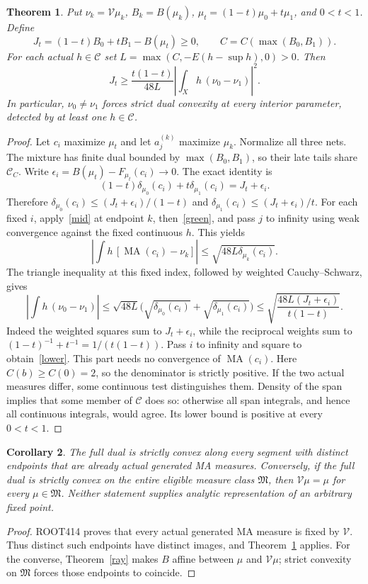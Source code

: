 \documentclass[11pt]{article}
\newtheorem{theorem}{Theorem}
\newtheorem{corollary}[theorem]{Corollary}
\newcommand{\C}{\mathcal C}
\newcommand{\M}{\mathfrak M}
\newcommand{\MA}{\operatorname{MA}}
\newcommand{\V}{\mathcal V}
\begin{document}
\begin{theorem}\label{jensen}
Put $\nu_k=\V\mu_k$, $B_k=B(\mu_k)$,
$\mu_t=(1-t)\mu_0+t\mu_1$, and $0<t<1$. Define
\[
 J_t=(1-t)B_0+tB_1-B(\mu_t)\ge0,\qquad
 C=C(\max(B_0,B_1)).
\]
For each actual $h\in\C$ set $L=\max(C,-E(h-\sup h),0)>0$.
Then
\begin{equation}\label{lower}
 J_t\ge\frac{t(1-t)}{48L}
       \left|\int_Xh\,(\nu_0-\nu_1)\right|^2.
\end{equation}
In particular, $\nu_0\ne\nu_1$ forces strict dual convexity
at every interior parameter, detected by at least one $h\in\C$.
\end{theorem}
\begin{proof}
Let $c_i$ maximize $\mu_t$ and let $a_j^{(k)}$ maximize $\mu_k$.
Normalize all three nets. The mixture has finite dual bounded by
$\max(B_0,B_1)$, so their late tails share $\C_C$. Write
$\epsilon_i=B(\mu_t)-F_{\mu_t}(c_i)\to0$. The exact identity is
\[
 (1-t)\delta_{\mu_0}(c_i)+t\delta_{\mu_1}(c_i)=J_t+\epsilon_i.
\]
Therefore $\delta_{\mu_0}(c_i)\le(J_t+\epsilon_i)/(1-t)$ and
$\delta_{\mu_1}(c_i)\le(J_t+\epsilon_i)/t$. For each fixed $i$,
apply~\eqref{mid} at endpoint $k$, then~\eqref{green}, and pass
$j$ to infinity using weak convergence against the fixed continuous
$h$. This yields
\[
 \left|\int h\,[\MA(c_i)-\nu_k]\right|
       \le\sqrt{48L\delta_{\mu_k}(c_i)}.
\]
The triangle inequality at this fixed index, followed by weighted
Cauchy--Schwarz, gives
\[
 \left|\int h\,(\nu_0-\nu_1)\right|
 \le\sqrt{48L}\bigl(\sqrt{\delta_{\mu_0}(c_i)}+
                       \sqrt{\delta_{\mu_1}(c_i)}\bigr)
 \le\sqrt{\frac{48L(J_t+\epsilon_i)}{t(1-t)}}.
\]
Indeed the weighted squares sum to $J_t+\epsilon_i$, while the
reciprocal weights sum to $(1-t)^{-1}+t^{-1}=1/(t(1-t))$.
Pass $i$ to infinity and square to obtain~\eqref{lower}. This
part needs no convergence of $\MA(c_i)$.
Here $C(b)\ge C(0)=2$, so the denominator is strictly positive.
If the two actual measures differ, some continuous test distinguishes
them. Density of the span implies that some member of $\C$ does
so: otherwise all span integrals, and hence all continuous integrals,
would agree. Its lower bound is positive at every $0<t<1$.
\end{proof}

\begin{corollary}
The full dual is strictly convex along every segment with distinct
endpoints that are already actual generated MA measures. Conversely,
if the full dual is strictly convex on the entire eligible measure
class $\M$, then $\V\mu=\mu$ for every $\mu\in\M$.
Neither statement supplies analytic representation of an arbitrary
fixed point.
\end{corollary}
\begin{proof}
ROOT414 proves that every actual generated MA measure is fixed by
$\V$. Thus distinct such endpoints have distinct images, and
Theorem~\ref{jensen} applies. For the converse,
Theorem~\ref{ray} makes $B$ affine between $\mu$ and $\V\mu$;
strict convexity on $\M$ forces those endpoints to coincide.
\end{proof}
\end{document}
